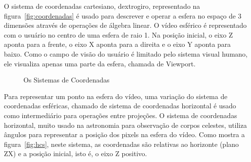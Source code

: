 O sistema de coordenadas cartesiano, dextrogiro, representado na figura~\ref{fig:coordenadas} é usado para descrever e operar a esfera no espaço de 3 dimensões através de operações de álgebra linear. O vídeo esférico é representado com o usuário no centro de uma esfera de raio 1. Na posição inicial, o eixo Z aponta para a frente, o eixo X aponta para a direita e o eixo Y aponta para baixo. Como o campo de visão do usuário é limitado pelo sistema visual humano, ele visualiza apenas uma parte da esfera, chamada de Viewport.

\begin{figure}[htbp]
        \centering
        
         \quad
         \quad
         \quad
        
        \caption{Os Sistemas de Coordenadas}
        \label{fig:coord_sis}
\end{figure}

Para representar um ponto na esfera do vídeo, uma variação do sistema de coordenadas esféricas, chamado de sistema de coordenadas horizontal é usado como intermediário para operações entre projeções. O sistema de coordenadas horizontal, muito usado na astronomia para observação de corpos celestes, utiliza ângulos para representar a posição dos pixels na esfera do vídeo. Como mostra a figura~\ref{fig:hcs}, neste sistema, as coordenadas são relativas ao horizonte (plano ZX) e a posição inicial, isto é, o eixo Z positivo. 

